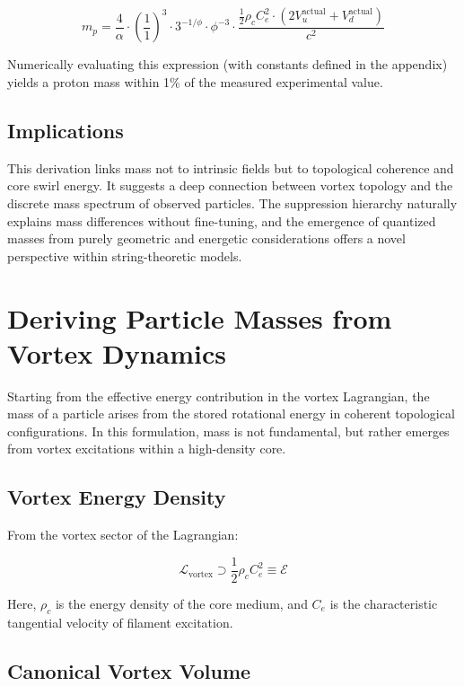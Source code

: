 \documentclass[11pt]{article}
\begin{document}
    \[
        m_p = \frac{4}{\alpha} \cdot \left( \frac{1}{1} \right)^3 \cdot 3^{-1/\phi} \cdot \phi^{-3} \cdot \frac{\frac{1}{2} \rho_c C_e^2 \cdot (2 V_u^{\text{actual}} + V_d^{\text{actual}})}{c^2}
    \]

    Numerically evaluating this expression (with constants defined in the appendix) yields a proton mass within 1\% of the measured experimental value.

    \subsection{Implications}

    This derivation links mass not to intrinsic fields but to topological coherence and core swirl energy. It suggests a deep connection between vortex topology and the discrete mass spectrum of observed particles. The suppression hierarchy naturally explains mass differences without fine-tuning, and the emergence of quantized masses from purely geometric and energetic considerations offers a novel perspective within string-theoretic models.


    \section{Deriving Particle Masses from Vortex Dynamics}

    Starting from the effective energy contribution in the vortex Lagrangian, the mass of a particle arises from the stored rotational energy in coherent topological configurations. In this formulation, mass is not fundamental, but rather emerges from vortex excitations within a high-density core.

    \subsection{Vortex Energy Density}

    From the vortex sector of the Lagrangian:

    \[
        \mathcal{L}_\text{vortex} \supset \frac{1}{2} \rho_c C_e^2 \equiv \mathcal{E}
    \]

    Here, \( \rho_c \) is the energy density of the core medium, and \( C_e \) is the characteristic tangential velocity of filament excitation.

    \subsection{Canonical Vortex Volume}
\end{document}
